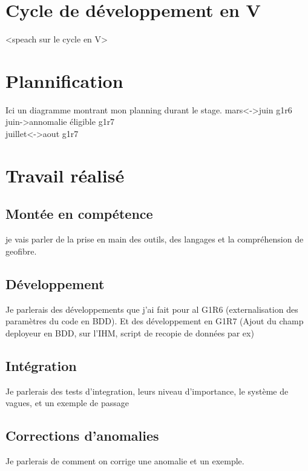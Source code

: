 \chapter{Cycle de développement en V}
<speach sur le cycle en V>
\begin{figure}
\end{figure}
\chapter{Plannification}
Ici un diagramme montrant mon planning durant le stage.
mars<->juin g1r6\\
juin->annomalie éligible g1r7\\
juillet<->aout g1r7
\chapter{Travail réalisé}
\section{Montée en compétence}
je vais parler de la prise en main des outils, des langages et la compréhension de geofibre.
\section{Développement}
Je parlerais des développements que j'ai fait pour al G1R6 (externalisation des paramètres du code en BDD).
Et des développement en G1R7 (Ajout du champ deployeur en BDD, sur l'IHM, script de recopie de données par ex)
\section{Intégration}
Je parlerais des tests d'integration, leurs niveau d'importance, le système de vagues, et un exemple de passage
\section{Corrections d'anomalies}
Je parlerais de comment on corrige une anomalie et un exemple.
